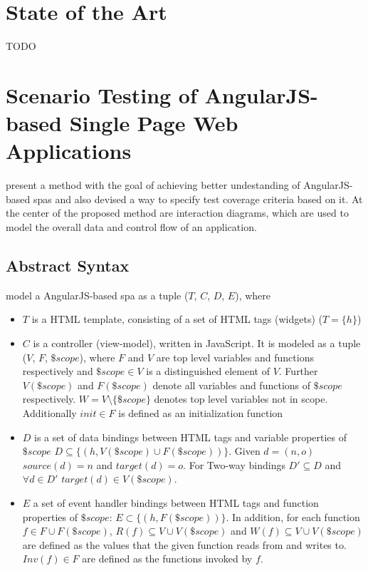 \section{State of the Art}
TODO
%

\section{Scenario Testing of AngularJS-based Single Page Web Applications}
\textcite{zhang2019scenario} present a method with the goal of achieving better undestanding of AngularJS-based \glspl{spa} and also devised a way to specify test coverage criteria based on it. At the center of the proposed method are interaction diagrams, which are used to model the overall data and control flow of an application.\parencite{zhang2019scenario}

\subsection{Abstract Syntax}
\textcite{zhang2019scenario} model a AngularJS-based \gls{spa} as a tuple ($T$, $C$, $D$, $E$), where

\begin{itemize}
  \item $T$ is a HTML template, consisting of a set of HTML tags (widgets) ($T = \{h\}$)
  \item 
  $C$ is a controller (view-model), written in JavaScript. It is modeled as a tuple ($V$, $F$, $\$scope$), where $F$ and $V$ are top level variables and functions respectively and $\$scope \in V$ is a distinguished element of $V$. Further $V(\$scope)$ and $F(\$scope)$ denote all variables and functions of $\$scope$ respectively. $W = V \setminus \{\$scope\}$ denotes top level variables not in scope. Additionally $init \in F$ is defined as an initialization function
  \item $D$ is a set of data bindings between HTML tags and variable properties of $\$scope$ $ D \subseteq \{(h,V(\$scope) \cup F(\$scope))\}$. Given $d = (n,o)$ $source(d) = n$ and $target(d) = o$. For Two-way bindings $D' \subseteq D$ and $\forall d \in D'$ $target(d) \in V(\$scope)$.
  \item $E$ a set of event handler bindings between HTML tags and function properties of $\$scope$: $E \subset \{(h,F(\$scope))\}$. In addition, for each function $f \in F \cup F(\$scope)$, $R(f) \subseteq V \cup V(\$scope)$ and $W(f) \subseteq V \cup V(\$scope)$ are defined as the values that the given function reads from and writes to. $Inv(f) \in F $ are defined as the functions invoked by $f$. \parencite{zhang2019scenario}
\end{itemize}
